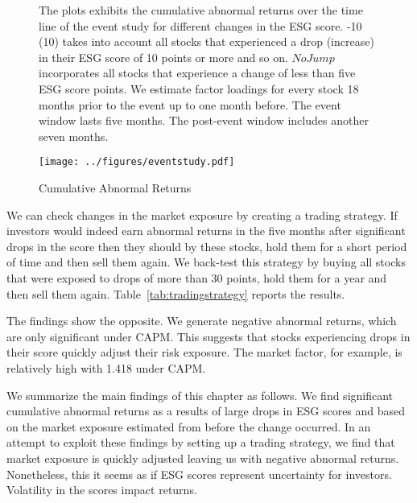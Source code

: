 \documentclass[11pt]{article}
\newcommand\fnote[1]{\captionsetup{font=small}\caption*{#1}}
\begin{document}
\begin{figure}[!htbp]
	\centering
	\caption{Cumulative Abnormal Returns}
	\fnote{The plots exhibits the cumulative abnormal returns over the time line of the event study for different changes in the ESG score. -10 (10) takes into account all stocks that experienced a drop (increase) in their ESG score of 10 points or more and so on. $No Jump$ incorporates all stocks that experience a change of less than five ESG score points. We estimate factor loadings for every stock 18 months prior to the event up to one month before. The event window lasts five months. The post-event window includes another seven months.}
	\label{fig:eventstudy}
	\vspace{-1cm}
	\texttt{[image: ../figures/eventstudy.pdf]}
\end{figure}


We can check changes in the market exposure by creating a trading strategy. If investors would indeed earn abnormal returns in the five months after significant drops in the score then they should by these stocks, hold them for a short period of time and then sell them again. We back-test this strategy by buying all stocks that were exposed to drops of more than 30 points, hold them for a year and then sell them again. Table~\ref{tab:tradingstrategy} reports the results. 

The findings show the opposite. We generate negative abnormal returns, which are only significant under CAPM. This suggests that stocks experiencing drops in their score quickly adjust their risk exposure. The market factor, for example, is relatively high with 1.418 under CAPM. 

We summarize the main findings of this chapter as follows. We find significant cumulative abnormal returns as a results of large drops in ESG scores and based on the market exposure estimated from before the change occurred. In an attempt to exploit these findings by setting up a trading strategy, we find that market exposure is quickly adjusted leaving us with negative abnormal returns. Nonetheless, this it seems as if ESG scores represent uncertainty for investors. Volatility in the scores impact returns. 
\end{document}
